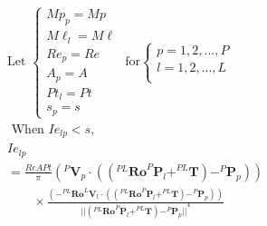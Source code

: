 \begin{description}
            \begin{equation}
                \label{eqn:model_no_lamb}
                \begin{aligned}
                    &\text{Let }
                    \begin{cases}
                        Mp_p=Mp\\M\ell_l=M\ell\\Re_p=Re\\A_p=A\\Pt_l=Pt\\s_p=s
                    \end{cases}
                    \text{ for}
                    \begin{cases}
                        p = 1,2,...,P\\
                        l = 1,2,...,L\\
                    \end{cases}\\
                    &\text { When } Ie_{lp}<s ,\\
                    &Ie_{lp} \\
                        &= \frac{ReAPt}{ \pi}
                        {( ^{P}\boldsymbol{V}_p \cdot 
                                (
                                    (
                                        ^{PL} \boldsymbol{Ro}^{P}\boldsymbol{P}_l
                                        + ^{PL}\boldsymbol{T}
                                    )
                                    - ^{P}\boldsymbol{P}_p
                                )
                            )}\\
                    & \qquad \times
                        \frac{  
                            (
                                -^{PL}\boldsymbol{Ro}^{L}\boldsymbol{V}_l 
                                \cdot 
                                (
                                    (
                                        ^{PL}\boldsymbol{Ro}^{P}\boldsymbol{P}_l
                                        +^{PL}\boldsymbol{T}
                                    )
                                    - ^{P}\boldsymbol{P}_p
                                )
                            )
                        } 
                        {
                            {
                                ||
                                    (^{PL}\boldsymbol{Ro}^{P}\boldsymbol{P}_l+^{PL}\boldsymbol{T})
                                    - ^{P}\boldsymbol{P}_p
                                ||
                            }^{4}
                        }\\
                \end{aligned}
            \end{equation}


\end{description}
